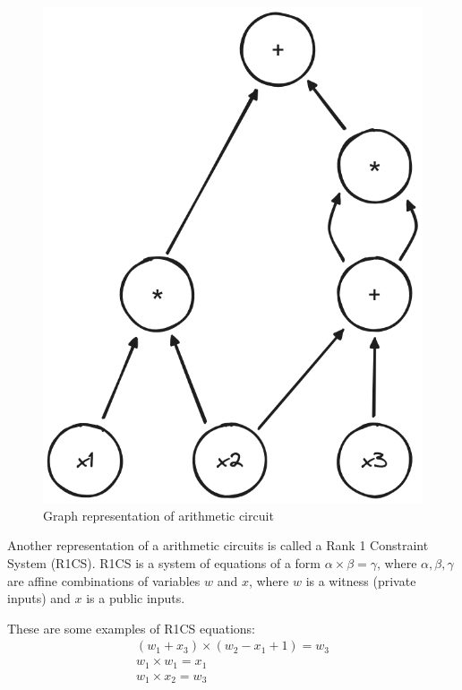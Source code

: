 \begin{figure}[h]
    \centering
    \includegraphics[scale=0.25]{assets/images/dag_example.png}
    \caption{Graph representation of arithmetic circuit}
    \label{fig:dag_example}
    \vspace{0.5cm}
\end{figure}

Another representation of a arithmetic circuits is called a Rank 1 Constraint
System (R1CS). R1CS is a system of equations of a form $\alpha \times \beta = \gamma$,
where $\alpha, \beta, \gamma$ are affine combinations of variables $w$ and $x$,
where $w$ is a witness (private inputs) and $x$ is a public inputs.

These are some examples of R1CS equations:
\begin{displaymath}
	\begin{array}{l}
		(w_1 + x_3) \times (w_2 - x_1 + 1) = w_3 	\\
		w_1 \times w_1 = x_1						\\
		w_1 \times x_2 = w_3
	\end{array}
\end{displaymath}

